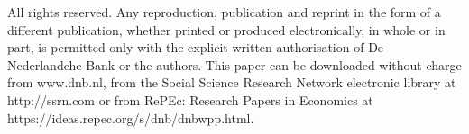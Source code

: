 \documentclass[11pt]{article}
\begin{document}
\noindent All rights reserved. Any reproduction, publication and reprint in the form of a different publication, whether printed or produced electronically, in whole or in part, is permitted only with the explicit written authorisation of De Nederlandche Bank or the authors. This paper can be downloaded without charge from www.dnb.nl, from the Social Science Research Network electronic library at http://ssrn.com or from RePEc: Research Papers in Economics at https://ideas.repec.org/s/dnb/dnbwpp.html.
\end{document}
